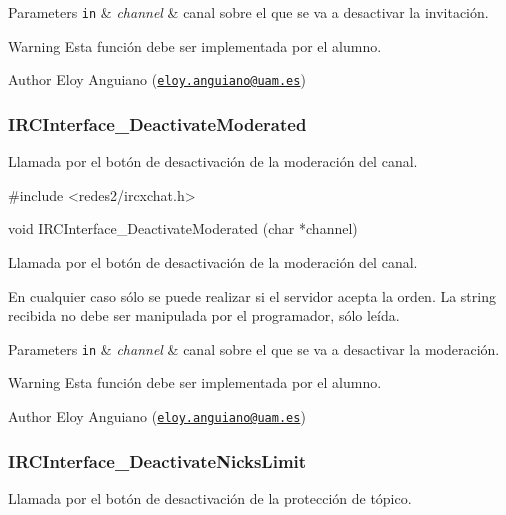 \begin{DoxyParams}[1]{Parameters}
\mbox{\tt in}  & {\em channel} & canal sobre el que se va a desactivar la invitación.\\
\hline
\end{DoxyParams}
\begin{DoxyWarning}{Warning}
Esta función debe ser implementada por el alumno.
\end{DoxyWarning}
\begin{DoxyAuthor}{Author}
Eloy Anguiano (\href{mailto:eloy.anguiano@uam.es}{\tt eloy.\+anguiano@uam.\+es})
\end{DoxyAuthor}


 \hypertarget{IRCInterface_DeactivateModerated}{}\subsubsection{I\+R\+C\+Interface\+\_\+\+Deactivate\+Moderated}\label{IRCInterface_DeactivateModerated}
Llamada por el botón de desactivación de la moderación del canal.


\begin{DoxyCode}
\textcolor{preprocessor}{#include <redes2/ircxchat.h>}

\textcolor{keywordtype}{void} IRCInterface\_DeactivateModerated (\textcolor{keywordtype}{char} *channel)
\end{DoxyCode}


Llamada por el botón de desactivación de la moderación del canal.

En cualquier caso sólo se puede realizar si el servidor acepta la orden. La string recibida no debe ser manipulada por el programador, sólo leída.


\begin{DoxyParams}[1]{Parameters}
\mbox{\tt in}  & {\em channel} & canal sobre el que se va a desactivar la moderación.\\
\hline
\end{DoxyParams}
\begin{DoxyWarning}{Warning}
Esta función debe ser implementada por el alumno.
\end{DoxyWarning}
\begin{DoxyAuthor}{Author}
Eloy Anguiano (\href{mailto:eloy.anguiano@uam.es}{\tt eloy.\+anguiano@uam.\+es})
\end{DoxyAuthor}


 \hypertarget{IRCInterface_DeactivateNicksLimit}{}\subsubsection{I\+R\+C\+Interface\+\_\+\+Deactivate\+Nicks\+Limit}\label{IRCInterface_DeactivateNicksLimit}
Llamada por el botón de desactivación de la protección de tópico.



